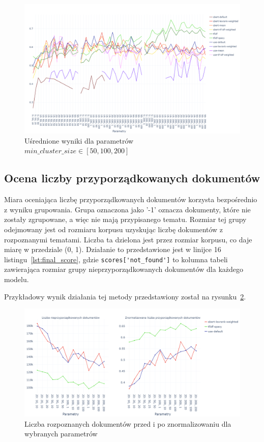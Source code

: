 	\begin{figure}
		\centering
		\includegraphics[width=1.5\textwidth,angle=90]{rys05/avg.png}
		\caption{Uśrednione wyniki dla parametrów \(min\_cluster\_size\in \left[50, 100, 200\right]\)}\label{fig:avg_scores} %
	\end{figure}

	\subsection{Ocena liczby przyporządkowanych dokumentów}\label{sec:score_not_found}
		Miara oceniająca liczbę przyporządkowanych dokumentów korzysta bezpośrednio z wyniku grupowania.
		Grupa oznaczona jako '-1' oznacza dokumenty, które nie zostały zgrupowane, a więc nie mają przypisanego tematu.
		Rozmiar tej grupy odejmowany jest od rozmiaru korpusu uzyskując liczbę dokumentów z rozpoznanymi tematami.
		Liczba ta dzielona jest przez rozmiar korpusu, co daje miarę w przedziale (0, 1).
		Działanie to przedstawione jest w linijce 16 listingu~\ref{lst:final_score},
			gdzie \verb|scores['not_found']| to kolumna tabeli zawierająca rozmiar grupy nieprzyporządkowanych dokumentów dla każdego modelu.
		
		Przykładowy wynik działania tej metody przedstawiony został na rysunku~\ref{fig:not_found}.

		\begin{figure}[htb]
			\centering
			\includegraphics[width=\linewidth]{rys05/not_found.png}
			\caption{Liczba rozpoznanych dokumentów przed i po znormalizowaniu dla wybranych parametrów}\label{fig:not_found}
		\end{figure}

